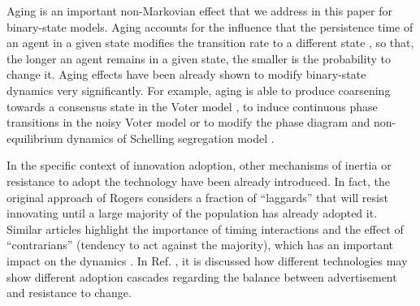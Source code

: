 Aging is an important non-Markovian effect that we address in this paper for binary-state models. Aging accounts for the influence that the persistence time of an agent in a given state modifies the transition rate to a different state \cite{stark-2008,fernandez-gracia-2011,perez-2016,boguna-2014,chen-2020}, so that, the longer an agent remains in a given state, the smaller is the probability to change it. Aging effects have been already shown to modify binary-state dynamics very significantly. For example, aging is able to produce coarsening towards a consensus state in the Voter model \cite{fernandez-gracia-2011,peralta-2020C}, to induce continuous phase transitions in the noisy Voter model \cite{artime-2018,peralta-2020A} or to modify the phase diagram and non-equilibrium dynamics of Schelling segregation model \cite{Abella}. 

In the specific context of innovation adoption, other mechanisms of inertia or resistance to adopt the technology have been already introduced. In fact, the original approach of Rogers \cite{rogers2014} considers a fraction of ``laggards'' that will resist innovating until a large majority of the population has already adopted it. Similar articles highlight the importance of timing interactions \cite{bass1969} and the effect of ``contrarians'' (tendency to act against the majority), which has an important impact on the dynamics \cite{galam-2008,goncalves-2012}. In Ref. \cite{goncalves-2012}, it is discussed how different technologies may show different adoption cascades regarding the balance between advertisement and resistance to change.



